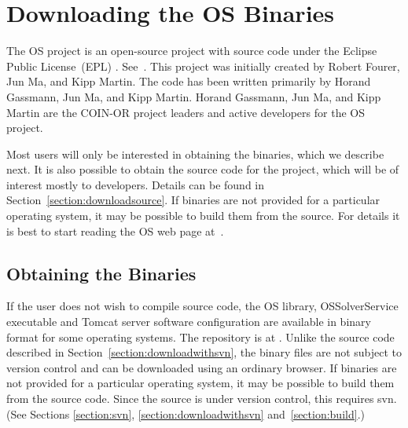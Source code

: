 \section{Downloading the OS Binaries}\label{section:downloadbinaries}

The OS project is an open-source project  with source code under the Eclipse Public License~(EPL)%
.
See~{\tt\UrlEpl}.  This project was initially created by Robert Fourer, Jun Ma, and Kipp Martin.
The code has been written primarily by  Horand Gassmann,   Jun Ma,  and Kipp Martin.    
Horand Gassmann,  Jun Ma,  and Kipp Martin are the COIN-OR project leaders and active developers for the OS project.

Most users will only be interested in obtaining the binaries, which we describe  next.
It is also possible to obtain the source code for the project, which will be of interest mostly to developers. 
\ifdevelop
Details can be found in  Section~\ref{section:downloadsource}.
\else
If binaries are not provided for a particular operating system, it may be possible to build them from the source.
For details it is best to start reading the OS web page at~{\tt\UrlOsWiki}.
\fi



\subsection{Obtaining the Binaries}\label{section:obtainingbinaries}

If the user does not wish to compile source code, the OS library, OSSolverService executable
and Tomcat server software configuration are available in binary format for some operating systems.     
The repository is at {\tt\UrlOsBinaries}. Unlike the source code described 
in Section~\ref{section:downloadwithsvn}, the binary files are not subject to version control and can be
downloaded using an ordinary browser. If binaries are not provided for a particular operating system,
it may be possible to build them from the source code. Since the source is under version control, 
this requires svn. (See Sections \ref{section:svn}, \ref{section:downloadwithsvn} and~\ref{section:build}.)

